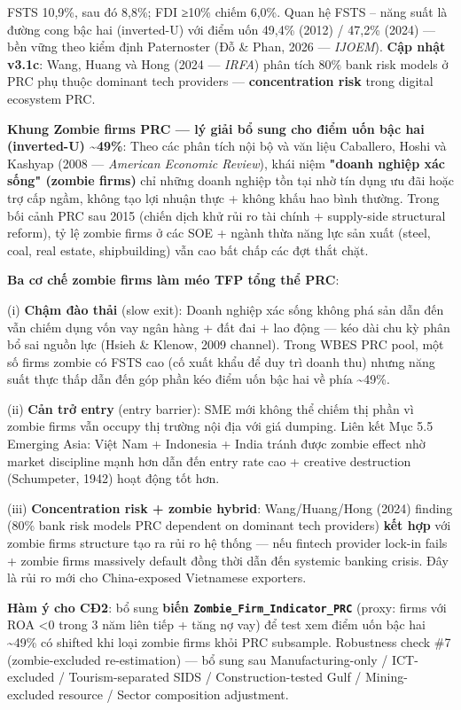 \documentclass[12pt,a4paper]{article}
\begin{document}
FSTS 10,9\%, sau đó 8,8\%; FDI ≥10\% chiếm 6,0\%. Quan hệ FSTS -- năng
suất là đường cong bậc hai (inverted-U) với điểm uốn 49,4\% (2012) /
47,2\% (2024) --- bền vững theo kiểm định Paternoster (Đỗ \& Phan, 2026
--- \emph{IJOEM}). \textbf{Cập nhật v3.1c}: Wang, Huang và Hong (2024
--- \emph{IRFA}) phân tích 80\% bank risk models ở PRC phụ thuộc
dominant tech providers --- \textbf{concentration risk} trong digital
ecosystem PRC.

\textbf{Khung Zombie firms PRC --- lý giải bổ sung cho điểm uốn bậc hai
(inverted-U) \textasciitilde49\%}: Theo các phân tích nội bộ và văn liệu
Caballero, Hoshi và Kashyap (2008 --- \emph{American Economic Review}),
khái niệm \textbf{"doanh nghiệp xác sống" (zombie firms)} chỉ những
doanh nghiệp tồn tại nhờ tín dụng ưu đãi hoặc trợ cấp ngầm, không tạo
lợi nhuận thực + không khấu hao bình thường. Trong bối cảnh PRC sau 2015
(chiến dịch khử rủi ro tài chính + supply-side structural reform), tỷ lệ
zombie firms ở các SOE + ngành thừa năng lực sản xuất (steel, coal, real
estate, shipbuilding) vẫn cao bất chấp các đợt thắt chặt.

\textbf{Ba cơ chế zombie firms làm méo TFP tổng thể PRC}:

(i) \textbf{Chậm đào thải} (slow exit): Doanh nghiệp xác sống không phá
sản dẫn đến vẫn chiếm dụng vốn vay ngân hàng + đất đai + lao động ---
kéo dài chu kỳ phân bổ sai nguồn lực (Hsieh \& Klenow, 2009 channel).
Trong WBES PRC pool, một số firms zombie có FSTS cao (cố xuất khẩu để
duy trì doanh thu) nhưng năng suất thực thấp dẫn đến góp phần kéo điểm
uốn bậc hai về phía \textasciitilde49\%.

(ii) \textbf{Cản trở entry} (entry barrier): SME mới không thể chiếm thị
phần vì zombie firms vẫn occupy thị trường nội địa với giá dumping. Liên
kết Mục 5.5 Emerging Asia: Việt Nam + Indonesia + India tránh được
zombie effect nhờ market discipline mạnh hơn dẫn đến entry rate cao +
creative destruction (Schumpeter, 1942) hoạt động tốt hơn.

(iii) \textbf{Concentration risk + zombie hybrid}: Wang/Huang/Hong
(2024) finding (80\% bank risk models PRC dependent on dominant tech
providers) \textbf{kết hợp} với zombie firms structure tạo ra rủi ro hệ
thống --- nếu fintech provider lock-in fails + zombie firms massively
default đồng thời dẫn đến systemic banking crisis. Đây là rủi ro mới cho
China-exposed Vietnamese exporters.

\textbf{Hàm ý cho CĐ2}: bổ sung \textbf{biến
\texttt{Zombie\_Firm\_Indicator\_PRC}} (proxy: firms với ROA \textless0
trong 3 năm liên tiếp + tăng nợ vay) để test xem điểm uốn bậc hai
\textasciitilde49\% có shifted khi loại zombie firms khỏi PRC subsample.
Robustness check \#7 (zombie-excluded re-estimation) --- bổ sung sau
Manufacturing-only / ICT-excluded / Tourism-separated SIDS /
Construction-tested Gulf / Mining-excluded resource / Sector composition
adjustment.
\end{document}
